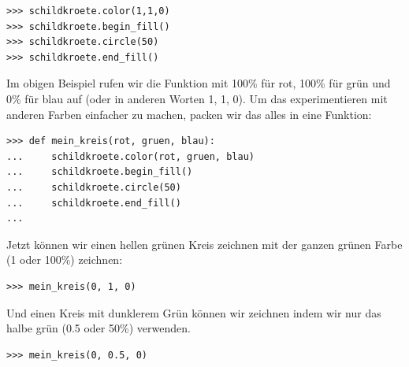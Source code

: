 \begin{Verbatim}[frame=single]
>>> schildkroete.color(1,1,0)
>>> schildkroete.begin_fill()
>>> schildkroete.circle(50)
>>> schildkroete.end_fill()
\end{Verbatim}

Im obigen Beispiel rufen wir die  Funktion mit 100\% für rot, 100\% für grün und 0\% für blau auf (oder in anderen Worten 1, 1, 0). Um das experimentieren mit anderen Farben einfacher zu machen, packen wir das alles in eine Funktion:

\begin{Verbatim}[frame=single]
>>> def mein_kreis(rot, gruen, blau):
...     schildkroete.color(rot, gruen, blau)
...     schildkroete.begin_fill()
...     schildkroete.circle(50)
...     schildkroete.end_fill()
...
\end{Verbatim}

\noindent
Jetzt können wir einen hellen grünen Kreis zeichnen mit der ganzen grünen Farbe (1 oder 100\%) zeichnen:

\begin{Verbatim}[frame=single]
>>> mein_kreis(0, 1, 0)
\end{Verbatim}

\noindent
Und einen Kreis mit dunklerem Grün können wir zeichnen indem wir nur das halbe grün (0.5 oder 50\%) verwenden.

\begin{Verbatim}[frame=single]
>>> mein_kreis(0, 0.5, 0)
\end{Verbatim}


